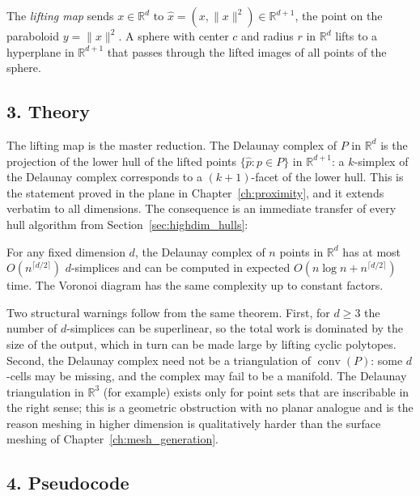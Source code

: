 \begin{definition}
\label{def:highdim_lifting}
The \emph{lifting map} sends $x \in \mathbb{R}^d$ to
$\widehat{x} = (x, \|x\|^2) \in \mathbb{R}^{d+1}$, the point on the paraboloid
$y = \|x\|^2$. A sphere with center $c$ and radius $r$ in $\mathbb{R}^d$
lifts to a hyperplane in $\mathbb{R}^{d+1}$ that passes through the lifted
images of all points of the sphere.
\end{definition}

\subsection{3. Theory}

The lifting map is the master reduction. The Delaunay complex of $P$ in
$\mathbb{R}^d$ is the projection of the lower hull of the lifted points
$\{\widehat{p} : p \in P\}$ in $\mathbb{R}^{d+1}$: a $k$-simplex of the
Delaunay complex corresponds to a $(k+1)$-facet of the lower hull. This is the
statement proved in the plane in Chapter~\ref{ch:proximity}, and it extends
verbatim to all dimensions. The consequence is an immediate transfer of every
hull algorithm from Section~\ref{sec:highdim_hulls}:

\begin{theorem}
\label{thm:highdim_delaunay_complexity}
For any fixed dimension $d$, the Delaunay complex of $n$ points in
$\mathbb{R}^d$ has at most $O(n^{\lceil d/2 \rceil})$ $d$-simplices and can be
computed in expected $O(n \log n + n^{\lceil d/2 \rceil})$ time. The Voronoi
diagram has the same complexity up to constant factors.
\end{theorem}

Two structural warnings follow from the same theorem. First, for $d \ge 3$ the
number of $d$-simplices can be superlinear, so the total work is dominated by
the size of the output, which in turn can be made large by lifting cyclic
polytopes. Second, the Delaunay complex need not be a triangulation of
$\operatorname{conv}(P)$: some $d$-cells may be missing, and the complex may
fail to be a manifold. The Delaunay triangulation in $\mathbb{R}^3$ (for
example) exists only for point sets that are inscribable in the right sense; this is a geometric obstruction with
 no planar analogue and is the reason meshing in higher dimension is
 qualitatively harder than the surface meshing of Chapter~\ref{ch:mesh_generation}.

\subsection{4. Pseudocode}

